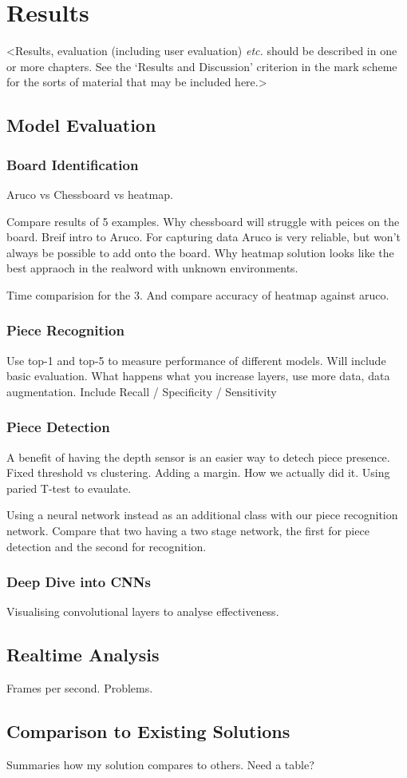 \chapter{Results}
\label{chapter3}

<Results, evaluation (including user evaluation) {\em etc.} should be described in one or more chapters. See the `Results and Discussion' criterion in the mark scheme for the sorts of material that may be included here.>

\section{Model Evaluation}

\subsection{Board Identification}
Aruco vs Chessboard vs heatmap. 

Compare results of 5 examples.  Why chessboard \cite{} will struggle with peices on the board.
Breif intro to Aruco.  For capturing data Aruco is very reliable, but won't always be possible to add onto the board.
Why heatmap solution looks like the best appraoch in the realword with unknown environments.  \cite{}

Time comparision for the 3.  And compare accuracy of heatmap against aruco.

\subsection{Piece Recognition}
Use top-1 and top-5 to measure performance of different models.
Will include basic evaluation.  What happens what you increase layers, use more data, data augmentation.
Include Recall / Specificity / Sensitivity

\subsection{Piece Detection}
A benefit of having the depth sensor is an easier way to detech piece presence.  
Fixed threshold vs clustering.  Adding a margin.  How we actually did it.
Using paried T-test to evaulate.

Using a neural network instead as an additional class with our piece recognition network.
Compare that two having a two stage network, the first for piece detection and the second for recognition.

\subsection{Deep Dive into CNNs}
Visualising convolutional layers to analyse effectiveness.

\section{Realtime Analysis}
Frames per second.  Problems.

\section{Comparison to Existing Solutions}
Summaries how my solution compares to others.  Need a table?
